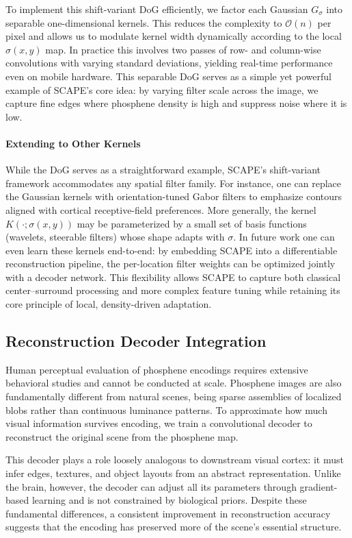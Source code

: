 To implement this shift-variant DoG efficiently, we factor each Gaussian \(G_{\sigma}\) into separable one-dimensional kernels. This reduces the complexity to \(\mathcal{O}(n)\) per pixel and allows us to modulate kernel width dynamically according to the local \(\sigma(x,y)\) map.  In practice this involves two passes of row- and column-wise convolutions with varying standard deviations, yielding real-time performance even on mobile hardware.  This separable DoG serves as a simple yet powerful example of SCAPE’s core idea: by varying filter scale across the image, we capture fine edges where phosphene density is high and suppress noise where it is low.


\paragraph{Extending to Other Kernels}
While the DoG serves as a straightforward example, SCAPE’s shift-variant framework accommodates any spatial filter family.  For instance, one can replace the Gaussian kernels with orientation-tuned Gabor filters to emphasize contours aligned with cortical receptive-field preferences. More generally, the kernel \(K(\cdot;\sigma(x,y))\) may be parameterized by a small set of basis functions (wavelets, steerable filters) whose shape adapts with \(\sigma\).  In future work one can even learn these kernels end-to-end: by embedding SCAPE into a differentiable reconstruction pipeline, the per-location filter weights can be optimized jointly with a decoder network.  This flexibility allows SCAPE to capture both classical center–surround processing and more complex feature tuning while retaining its core principle of local, density-driven adaptation.  



\subsection{Reconstruction Decoder Integration}
Human perceptual evaluation of phosphene encodings requires extensive behavioral studies and cannot be conducted at scale. Phosphene images are also fundamentally different from natural scenes, being sparse assemblies of localized blobs rather than continuous luminance patterns. To approximate how much visual information survives encoding, we train a convolutional decoder to reconstruct the original scene from the phosphene map.

This decoder plays a role loosely analogous to downstream visual cortex: it must infer edges, textures, and object layouts from an abstract representation. Unlike the brain, however, the decoder can adjust all its parameters through gradient-based learning and is not constrained by biological priors. Despite these fundamental differences, a consistent improvement in reconstruction accuracy suggests that the encoding has preserved more of the scene’s essential structure.

